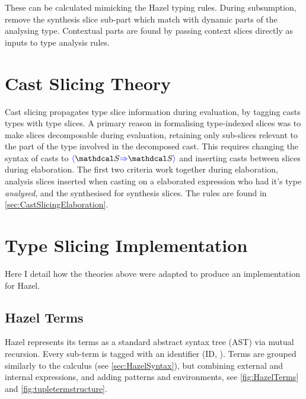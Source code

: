 These can be calculated mimicking the Hazel typing rules. During subsumption, remove the synthesis slice sub-part which match with dynamic parts of the analysing type. Contextual parts are found by passing context slices directly as inputs to type analysis rules.

\section{Cast Slicing Theory}\label{sec:CastSlicingTheory}
Cast slicing propagates type slice information during evaluation, by tagging casts types with type slices. A primary reason in formalising type-indexed slices was to make slices decomposable during evaluation, retaining only sub-slices relevant to the part of the type involved in the decomposed cast. This requires changing the syntax of casts to $\scast{\S}{\S}$ and inserting casts between slices during elaboration. The first two criteria work together during elaboration, analysis slices inserted when casting on a elaborated expression who had it's type \textit{analysed}, and the synthesised for synthesis slices. The rules are found in
\cref{sec:CastSlicingElaboration}.

\section{Type Slicing Implementation}\label{sec:TypeSlicingImplementation}
Here I detail how the theories above were adapted to produce an implementation for Hazel.
\subsection{Hazel Terms}
\label{sec:HazelTerms}
Hazel represents its terms as a standard abstract syntax tree (AST) via mutual recursion. Every sub-term is tagged with an identifier (ID, ). Terms are grouped similarly to the calculus (see \cref{sec:HazelSyntax}), but combining external and internal expressions, and adding patterns and environments, see \cref{fig:HazelTerms} and \ref{fig:tupletermstructure}.


